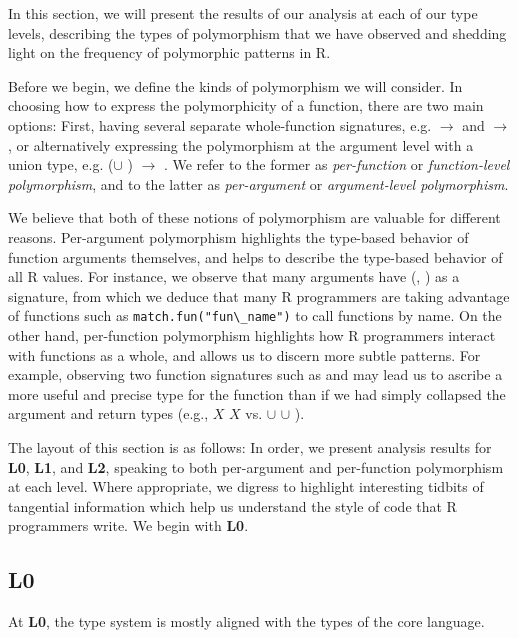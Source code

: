 \documentclass[acmsmall,10pt,review,anonymous]{acmart}\settopmatter{printfolios=true,printccs=false,printacmref=false}
\newcommand{\code}[1]{\lstinline|#1|\xspace}
\begin{document}
In this section, we will present the results of our analysis at each of our type levels, describing the types of polymorphism that we have observed and shedding light on the frequency of polymorphic patterns in R.

Before we begin, we define the kinds of polymorphism we will consider.
In choosing how to express the polymorphicity of a function, there are two main options:
First, having several separate whole-function signatures, e.g. \D $\rightarrow$ \D and \C $\rightarrow$ \D, or alternatively expressing the polymorphism at the argument level with a union type, e.g. (\D $\cup$ \C) $\rightarrow$ \C.
We refer to the former as {\it per-function} or {\it function-level polymorphism}, and to the latter as {\it per-argument} or {\it argument-level polymorphism}.

We believe that both of these notions of polymorphism are valuable for different reasons.
Per-argument polymorphism highlights the type-based behavior of function arguments themselves, and helps to describe the type-based behavior of all R values.
For instance, we observe that many arguments have (\sC, \sF) as a signature, from which we deduce that many R programmers are taking advantage of functions such as \code{match.fun("fun\_name")} to call functions by name.
On the other hand, per-function polymorphism highlights how R programmers interact with functions as a whole, and allows us to discern more subtle patterns.
For example, observing two function signatures such as \D \to \D and \sF \to \sF may lead us to ascribe a more useful and precise type for the function than if we had simply collapsed the argument and return types (e.g., $X$ \to $X$ vs. \D $\cup$ \sF \to \D $\cup$ \sF).

The layout of this section is as follows:
In order, we present analysis results for {\bf L0}, {\bf L1}, and {\bf L2}, speaking to both per-argument and per-function polymorphism at each level.
Where appropriate, we digress to highlight interesting tidbits of tangential information which help us understand the style of code that R programmers write.
We begin with {\bf L0}.

\subsection{L0}

At {\bf L0}, the type system is mostly aligned with the types of the core language.
\end{document}
